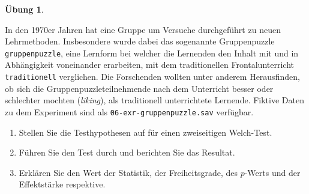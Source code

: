 \documentclass[
]{book}
\providecommand{\tightlist}{%
  \setlength{\itemsep}{0pt}\setlength{\parskip}{0pt}}
\theoremstyle{definition}
\theoremstyle{definition}
\theoremstyle{definition}
\newtheorem{exercise}{Übung}[chapter]
\theoremstyle{definition}
\theoremstyle{remark}
\begin{document}
\begin{exercise}
\protect\hypertarget{exr:gruppenpuzzle}{}\label{exr:gruppenpuzzle}\leavevmode

In den 1970er Jahren hat eine Gruppe um \citet{blaney1977} Versuche durchgeführt zu neuen Lehrmethoden. Insbesondere wurde dabei das sogenannte Gruppenpuzzle \texttt{gruppenpuzzle}, eine Lernform bei welcher die Lernenden den Inhalt mit und in Abhängigkeit voneinander erarbeiten, mit dem traditionellen Frontalunterricht \texttt{traditionell} verglichen. Die Forschenden wollten unter anderem Herausfinden, ob sich die Gruppenpuzzleteilnehmende nach dem Unterricht besser oder schlechter mochten (\emph{liking}), als traditionell unterrichtete Lernende. Fiktive Daten zu dem Experiment sind als \texttt{06-exr-gruppenpuzzle.sav} verfügbar.

\begin{enumerate}
\def\labelenumi{\alph{enumi})}
\tightlist
\item
  Stellen Sie die Testhypothesen auf für einen zweiseitigen Welch-Test.
\item
  Führen Sie den Test durch und berichten Sie das Resultat.
\item
  Erklären Sie den Wert der Statistik, der Freiheitsgrade, des \(p\)-Werts und der Effektstärke respektive.
\end{enumerate}

\end{exercise}
\end{document}
